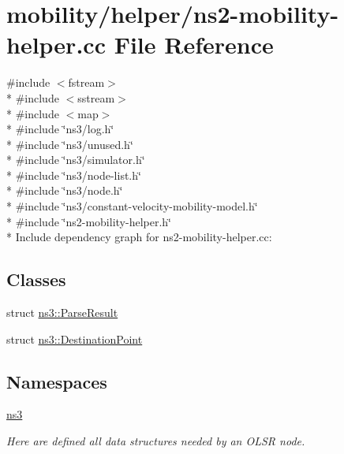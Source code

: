 \hypertarget{ns2-mobility-helper_8cc}{}\section{mobility/helper/ns2-\/mobility-\/helper.cc File Reference}
\label{ns2-mobility-helper_8cc}
{\ttfamily \#include $<$fstream$>$}\\*
{\ttfamily \#include $<$sstream$>$}\\*
{\ttfamily \#include $<$map$>$}\\*
{\ttfamily \#include \char`\"{}ns3/log.\+h\char`\"{}}\\*
{\ttfamily \#include \char`\"{}ns3/unused.\+h\char`\"{}}\\*
{\ttfamily \#include \char`\"{}ns3/simulator.\+h\char`\"{}}\\*
{\ttfamily \#include \char`\"{}ns3/node-\/list.\+h\char`\"{}}\\*
{\ttfamily \#include \char`\"{}ns3/node.\+h\char`\"{}}\\*
{\ttfamily \#include \char`\"{}ns3/constant-\/velocity-\/mobility-\/model.\+h\char`\"{}}\\*
{\ttfamily \#include \char`\"{}ns2-\/mobility-\/helper.\+h\char`\"{}}\\*
Include dependency graph for ns2-\/mobility-\/helper.cc\+:
\subsection*{Classes}
\begin{DoxyCompactItemize}
\item 
struct \hyperlink{structns3_1_1ParseResult}{ns3\+::\+Parse\+Result}
\item 
struct \hyperlink{structns3_1_1DestinationPoint}{ns3\+::\+Destination\+Point}
\end{DoxyCompactItemize}
\subsection*{Namespaces}
\begin{DoxyCompactItemize}
\item 
 \hyperlink{namespacens3}{ns3}
\begin{DoxyCompactList}\small\item\em Here are defined all data structures needed by an O\+L\+SR node. \end{DoxyCompactList}\end{DoxyCompactItemize}
